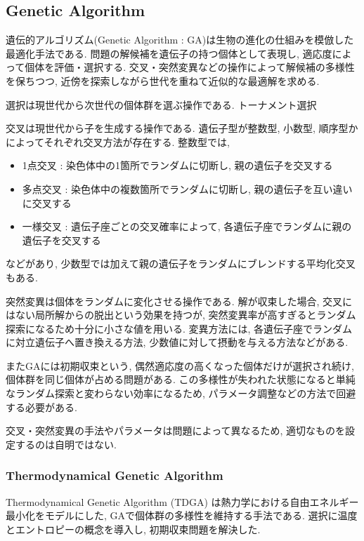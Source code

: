 \changeindent{0cm}
\subsection{Genetic Algorithm}
\changeindent{2cm}
\label{sec:02_ga}
遺伝的アルゴリズム(Genetic Algorithm : GA)は生物の進化の仕組みを模倣した最適化手法である.
問題の解候補を遺伝子の持つ個体として表現し, 適応度によって個体を評価・選択する.
交叉・突然変異などの操作によって解候補の多様性を保ちつつ,
近傍を探索しながら世代を重ねて近似的な最適解を求める.


選択は現世代から次世代の個体群を選ぶ操作である.
トーナメント選択

交叉は現世代から子を生成する操作である.
遺伝子型が整数型, 小数型, 順序型かによってそれぞれ交叉方法が存在する.
整数型では,
\begin{itemize}
  \item 1点交叉 : 染色体中の1箇所でランダムに切断し, 親の遺伝子を交叉する
  \item 多点交叉 : 染色体中の複数箇所でランダムに切断し, 親の遺伝子を互い違いに交叉する
  \item 一様交叉 : 遺伝子座ごとの交叉確率によって, 各遺伝子座でランダムに親の遺伝子を交叉する
\end{itemize}
などがあり, 少数型では加えて親の遺伝子をランダムにブレンドする平均化交叉もある.

突然変異は個体をランダムに変化させる操作である.
解が収束した場合, 交叉にはない局所解からの脱出という効果を持つが,
突然変異率が高すぎるとランダム探索になるため十分に小さな値を用いる.
変異方法には, 各遺伝子座でランダムに対立遺伝子へ置き換える方法, 少数値に対して摂動を与える方法などがある.

またGAには初期収束という, 偶然適応度の高くなった個体だけが選択され続け,
個体群を同じ個体が占める問題がある.
この多様性が失われた状態になると単純なランダム探索と変わらない効率になるため,
パラメータ調整などの方法で回避する必要がある.

交叉・突然変異の手法やパラメータは問題によって異なるため, 適切なものを設定するのは自明ではない.

\changeindent{0cm}
\subsubsection{Thermodynamical Genetic Algorithm}
\changeindent{2cm}
\label{sec:02_tdga}

Thermodynamical Genetic Algorithm (TDGA) は熱力学における自由エネルギー最小化をモデルにした,
GAで個体群の多様性を維持する手法である.
選択に温度とエントロピーの概念を導入し, 初期収束問題を解決した.

